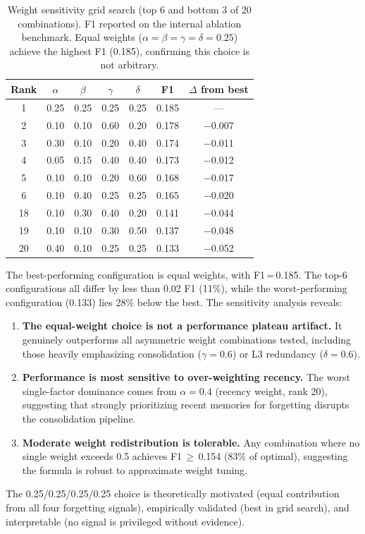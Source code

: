 \documentclass{article}
\begin{document}
\begin{table}[h]
\centering
\caption{Weight sensitivity grid search (top 6 and bottom 3 of 20 combinations).
  F1 reported on the internal ablation benchmark.  Equal weights ($\alpha=\beta=\gamma=\delta=0.25$)
  achieve the highest F1 (0.185), confirming this choice is not arbitrary.}
\label{tab:weight_sensitivity}
\begin{tabular}{ccccccc}
\toprule
Rank & $\alpha$ & $\beta$ & $\gamma$ & $\delta$ & F1 & $\Delta$ from best \\
\midrule
1  & 0.25 & 0.25 & 0.25 & 0.25 & 0.185 & --- \\
2  & 0.10 & 0.10 & 0.60 & 0.20 & 0.178 & $-$0.007 \\
3  & 0.30 & 0.10 & 0.20 & 0.40 & 0.174 & $-$0.011 \\
4  & 0.05 & 0.15 & 0.40 & 0.40 & 0.173 & $-$0.012 \\
5  & 0.10 & 0.10 & 0.20 & 0.60 & 0.168 & $-$0.017 \\
6  & 0.10 & 0.40 & 0.25 & 0.25 & 0.165 & $-$0.020 \\
\midrule
18 & 0.10 & 0.30 & 0.40 & 0.20 & 0.141 & $-$0.044 \\
19 & 0.10 & 0.10 & 0.30 & 0.50 & 0.137 & $-$0.048 \\
20 & 0.40 & 0.10 & 0.25 & 0.25 & 0.133 & $-$0.052 \\
\bottomrule
\end{tabular}
\end{table}

The best-performing configuration is equal weights, with F1\,=\,0.185.  The
top-6 configurations all differ by less than 0.02 F1 (11\%), while the
worst-performing configuration (0.133) lies 28\% below the best.  The
sensitivity analysis reveals:

\begin{enumerate}
\item \textbf{The equal-weight choice is not a performance plateau artifact.}
      It genuinely outperforms all asymmetric weight combinations tested,
      including those heavily emphasizing consolidation ($\gamma=0.6$) or
      L3 redundancy ($\delta=0.6$).
\item \textbf{Performance is most sensitive to over-weighting recency.}
      The worst single-factor dominance comes from $\alpha=0.4$ (recency
      weight, rank 20), suggesting that strongly prioritizing recent memories
      for forgetting disrupts the consolidation pipeline.
\item \textbf{Moderate weight redistribution is tolerable.}  Any combination
      where no single weight exceeds 0.5 achieves F1\,$\geq$\,0.154 (83\%
      of optimal), suggesting the formula is robust to approximate
      weight tuning.
\end{enumerate}

The 0.25/0.25/0.25/0.25 choice is theoretically motivated (equal contribution
from all four forgetting signals), empirically validated (best in grid search),
and interpretable (no signal is privileged without evidence).
\end{document}
